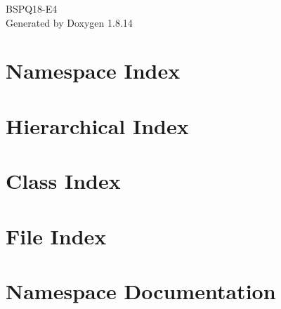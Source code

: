 \documentclass[twoside]{book}
\newcommand{\+}{\discretionary{\mbox{\scriptsize$\hookleftarrow$}}{}{}}
\newcommand{\clearemptydoublepage}{%
  \newpage{\pagestyle{empty}\cleardoublepage}%
}
\begin{document}
\hypersetup{pageanchor=false,
             bookmarksnumbered=true,
             pdfencoding=unicode
            }
\begin{titlepage}
\vspace*{7cm}
\begin{center}%
{\Large B\+S\+P\+Q18-\/\+E4 }\\
\vspace*{1cm}
{\large Generated by Doxygen 1.8.14}\\
\end{center}
\end{titlepage}
\clearemptydoublepage
{}
\tableofcontents
\clearemptydoublepage
{}
\hypersetup{pageanchor=true}

\chapter{Namespace Index}

\chapter{Hierarchical Index}

\chapter{Class Index}

\chapter{File Index}

\chapter{Namespace Documentation}












\end{document}
